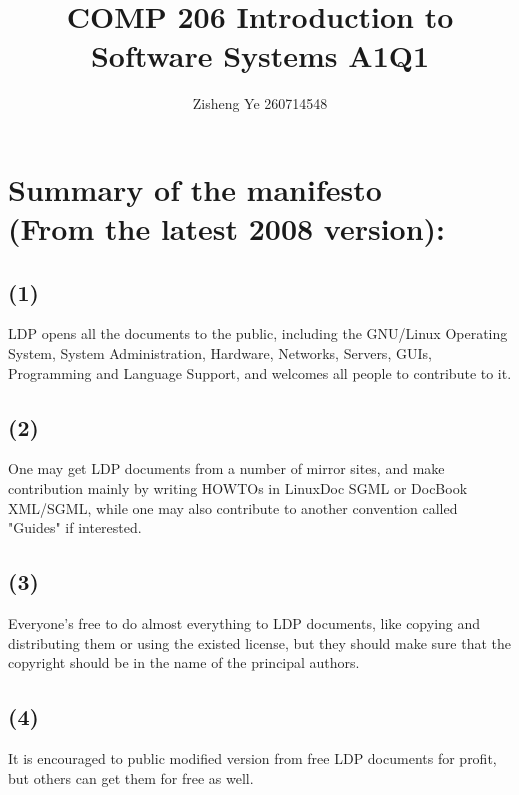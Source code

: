 \documentclass[paper=a4, fontsize=11pt]{report}
\title{COMP 206 Introduction to Software Systems A1Q1}
\author{Zisheng Ye   260714548}
\begin{document}
\maketitle
\section*{Summary of the manifesto
\\(From the latest 2008 version):}
\subsection*{(1)}
LDP opens all the documents to the public, including the GNU/Linux Operating System, System Administration, Hardware, Networks, Servers, GUIs, Programming and Language Support, and welcomes all people to contribute to it. 
\subsection*{(2)}
One may get LDP documents from a number of mirror sites, and make contribution mainly by writing HOWTOs in LinuxDoc SGML or DocBook XML/SGML, while one may also contribute to another convention called "Guides" if interested.
\subsection*{(3)}
Everyone's free to do almost everything to LDP documents, like copying and distributing them or using the existed license, but they should make sure that the copyright should be in the name of the principal authors.
\subsection*{(4)}
It is encouraged to public modified version from free LDP documents for profit, but others can get them for free as well. 
\end{document}
